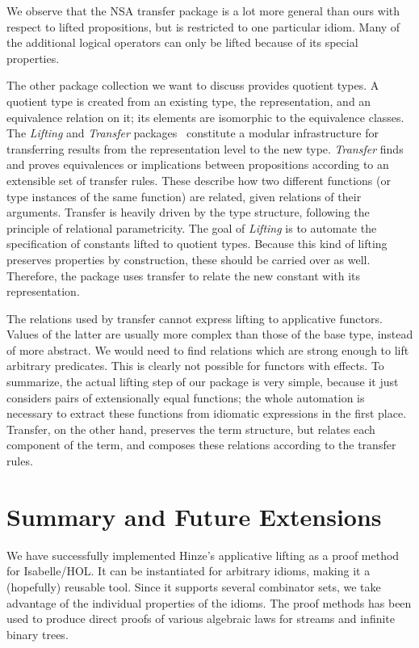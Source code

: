 We observe that the NSA transfer package is a lot more general than ours with
respect to lifted propositions, but is restricted to one particular idiom.
Many of the additional logical operators can only be lifted because of its
special properties.

The other package collection we want to discuss provides quotient types.
A quotient type is created from an existing type, the representation, and an
equivalence relation on it; its elements are isomorphic to the equivalence
classes.
The \emph{Lifting} and \emph{Transfer} packages~\cite{huffman13} constitute a
modular infrastructure for transferring results from the representation level
to the new type.
\emph{Transfer} finds and proves equivalences or implications between
propositions according to an extensible set of transfer rules.
These describe how two different functions (or type instances of the same
function) are related, given relations of their arguments.
Transfer is heavily driven by the type structure, following the principle of
relational parametricity.
The goal of \emph{Lifting} is to automate the specification of constants lifted
to quotient types.
Because this kind of lifting preserves properties by construction, these should
be carried over as well.
Therefore, the package uses transfer to relate the new constant with its
representation.

The relations used by transfer cannot express lifting to applicative functors.
Values of the latter are usually more complex than those of the base type,
instead of more abstract.
We would need to find relations which are strong enough to lift arbitrary
predicates.
This is clearly not possible for functors with effects.
To summarize, the actual lifting step of our package is very simple, because it
just considers pairs of extensionally equal functions;
the whole automation is necessary to extract these functions from idiomatic
expressions in the first place.
Transfer, on the other hand, preserves the term structure, but relates each
component of the term, and composes these relations according to the
transfer rules.


\section{Summary and Future Extensions}\label{subsec:summary-future}

We have successfully implemented Hinze's applicative lifting as a proof method
for Isabelle/HOL.
It can be instantiated for arbitrary idioms, making it a (hopefully) reusable
tool.
Since it supports several combinator sets, we take advantage of the individual
properties of the idioms.
The proof methods has been used to produce direct proofs of various algebraic
laws for streams and infinite binary trees.

